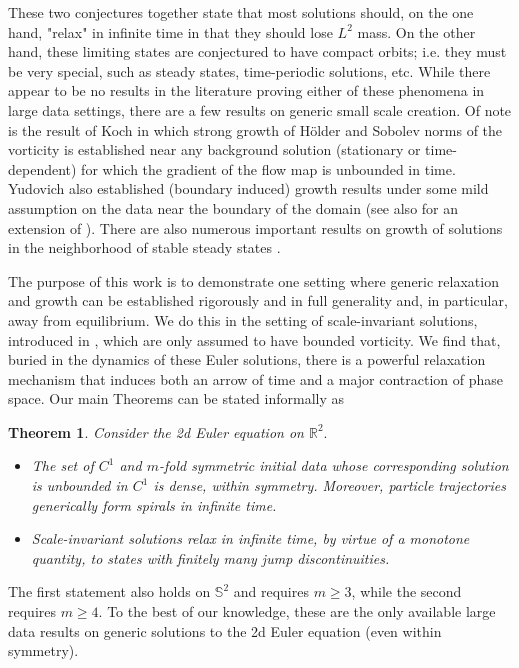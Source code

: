 \documentclass[10pt]{article}
\numberwithin{equation}{section}
\theoremstyle{plain}
\newtheorem{theorem}{Theorem}
\theoremstyle{definition}
\numberwithin{equation}{section}
\begin{document}
\noindent These two conjectures together state that most solutions should, on the one hand, "relax" in infinite time in that they should lose $L^2$ mass. On the other hand, these limiting states are conjectured to have compact orbits; i.e. they must be very special, such as steady states, time-periodic solutions, etc. While there appear to be no results in the literature proving either of these phenomena in large data settings, there are a few results on generic small scale creation. Of note is the result of Koch \cite{Koch} in which strong growth of H\"older and Sobolev norms of the vorticity is established near any background solution (stationary or time-dependent) for which the gradient of the flow map is unbounded in time. Yudovich also established (boundary induced) growth results under some mild assumption on the data near the boundary of the domain \cite{Yudovich} (see also \cite{MSY} for an extension of \cite{Yudovich}). There are also numerous important results on growth of solutions in the neighborhood of stable steady states \cite{Nadirashvili,Denisov, KiselevSverak, Zlatos, ED-review}.

The purpose of this work is to demonstrate one setting where generic relaxation and growth can be established rigorously and in full generality and, in particular, away from equilibrium. We do this in the setting of scale-invariant solutions, introduced in \cite{EJ-symmetries}, which are only assumed to have bounded vorticity. We find that, buried in the dynamics of these Euler solutions, there is a powerful relaxation mechanism that induces both an arrow of time and a major contraction of phase space.  Our main Theorems can be stated informally as
\begin{theorem}
Consider the 2d Euler equation on $\mathbb{R}^2.$
\begin{itemize}
\item The set of $C^1$ and $m$-fold symmetric initial data whose corresponding solution is unbounded in $C^1$ is dense, within symmetry. Moreover, particle trajectories generically form spirals in infinite time.
\item Scale-invariant solutions relax in infinite time, by virtue of a monotone quantity, to states with finitely many jump discontinuities. 
\end{itemize}
\end{theorem}
\noindent The first statement also holds on $\mathbb{S}^2$ and requires $m\geq 3$, while the second requires $m\geq 4$. To the best of our knowledge, these are the only available large data results on generic solutions to the 2d Euler equation (even within symmetry). 
\end{document}
